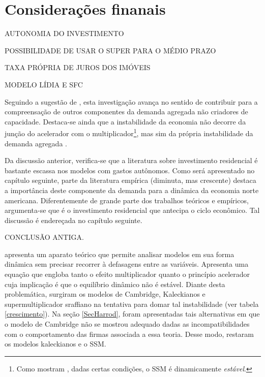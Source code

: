 \section{Considerações finanais}
\label{Concl1}

AUTONOMIA DO INVESTIMENTO

POSSIBILIDADE DE USAR O SUPER PARA O MÉDIO PRAZO

TAXA PRÓPRIA DE JUROS DOS IMÓVEIS

MODELO LÍDIA E SFC

Seguindo a sugestão de \textcite[p.~280]{freitas_growth_2015}, esta investigação avança no sentido de contribuir para a compreensação de outros componentes da demanda agregada não criadores de capacidade. Destaca-se ainda que a instabilidade da economia não decorre da junção do acelerador com o multiplicador\footnote{Como mostram \textcite{serrano_trouble_2017}, dadas certas condições, o SSM é dinamicamente \textit{estável}.}, mas sim da própria instabilidade da demanda agregada \cite{dejuan_hidden_2017}.


Da discussão anterior, verifica-se que a literatura sobre investimento residencial é bastante escassa nos modelos com gastos autônomos. Como será apresentado no capítulo seguinte, parte da literatura empírica (diminuta, mas crescente) destaca a importância deste componente da demanda para a dinâmica da economia norte americana. Diferentemente de grande parte dos trabalhos teóricos e empíricos, argumenta-se que é o investimento residencial que antecipa o ciclo econômico. Tal discussão é endereçada no capítulo seguinte.

CONCLUSÃO ANTIGA.


\textcite{harrod_essay_1939} apresenta um aparato teórico que permite analisar modelos em sua forma dinâmica sem precisar recorrer à defasagens entre as variáveis. Apresenta uma equação que engloba tanto o efeito multiplicador quanto o princípio acelerador cuja implicação é que o equilíbrio dinâmico não é estável. Diante desta problemática, surgiram os modelos de Cambridge, Kaleckianos e supermultiplicador sraffiano na tentativa para domar tal instabilidade (ver tabela \ref{crescimento}). Na seção \ref{SecHarrod}, foram apresentadas tais alternativas em que o modelo de Cambridge não se mostrou adequado dadas as incompatibilidades com o comportamento das firmas associada a essa teoria. Desse modo, restaram os modelos kaleckianos e o SSM. 

